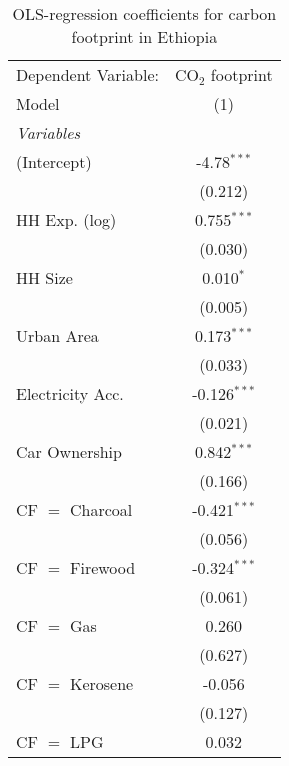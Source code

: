 
\begin{table}[htbp!]
   \centering
   \small
   \begin{adjustbox}{width = 1\textwidth, max height = 0.95\textheight, center}
      \begin{threeparttable}[b]
         \caption{\label{tab:OLS_2_ETH} OLS-regression coefficients for carbon footprint in Ethiopia}
         \begin{tabular}{lc}
            \tabularnewline \midrule \midrule
            Dependent Variable: & CO$_{2}$ footprint\\  
            Model               & (1)\\  
            \midrule
            \emph{Variables}\\
            (Intercept)         & -4.78$^{***}$\\   
                                & (0.212)\\   
            HH Exp. (log)       & 0.755$^{***}$\\   
                                & (0.030)\\   
            HH Size             & 0.010$^{*}$\\   
                                & (0.005)\\   
            Urban Area          & 0.173$^{***}$\\   
                                & (0.033)\\   
            Electricity Acc.    & -0.126$^{***}$\\   
                                & (0.021)\\   
            Car Ownership       & 0.842$^{***}$\\   
                                & (0.166)\\   
            CF $=$ Charcoal     & -0.421$^{***}$\\   
                                & (0.056)\\   
            CF $=$ Firewood     & -0.324$^{***}$\\   
                                & (0.061)\\   
            CF $=$ Gas          & 0.260\\   
                                & (0.627)\\   
            CF $=$ Kerosene     & -0.056\\   
                                & (0.127)\\   
            CF $=$ LPG          & 0.032\\   

\end{tabular}
\end{threeparttable}
\end{adjustbox}
\end{table}
